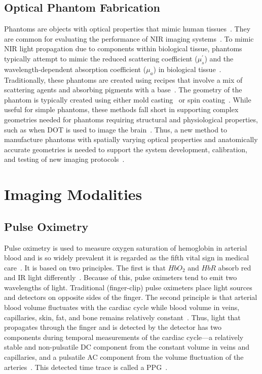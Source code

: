 \subsection{Optical Phantom Fabrication}
Phantoms are objects with optical properties that mimic human tissues~\cite{Pogue2006}. They are common for evaluating the performance of \ac{NIR} imaging systems~\cite{Pogue2006}. To mimic \ac{NIR} light propagation due to components within biological tissue, phantoms typically attempt to mimic the reduced scattering coefficient ($\mu_s^{'}$) and the wavelength-dependent absorption coefficient ($\mu_a$) in biological tissue~\cite{Dempsey2017}. Traditionally, these phantoms are created using recipes that involve a mix of scattering agents and absorbing pigments with a base~\cite{Hebden1995,Dong2015}. The geometry of the phantom is typically created using either mold casting~\cite{Hahn2012,Mobashsher2014} or spin coating~\cite{Park2013}. While useful for simple phantoms, these methods fall short in supporting complex geometries needed for phantoms requiring structural and physiological properties, such as when DOT is used to image the brain~\cite{Hebden2002,Villringer1997}. Thus, a new method to manufacture phantoms with spatially varying optical properties and anatomically accurate geometries is needed to support the system development, calibration, and testing of new imaging protocols~\cite{Cerussi2012,Diep2015}.  


\section{Imaging Modalities}
\label{chap:background:modalities}
\subsection{Pulse Oximetry}
Pulse oximetry is used to measure oxygen saturation of hemoglobin in arterial blood and is so widely prevalent it is regarded as the fifth vital sign in medical care~\cite{Neff1988}. It is based on two principles. The first is that $HbO_2$ and $HbR$ absorb red and \ac{IR} light differently~\cite{Bohn2015}. Because of this, pulse oximeters tend to emit two wavelengths of light. Traditional (finger-clip) pulse oximeters place light sources and detectors on opposite sides of the finger. The second principle is that arterial blood volume fluctuates with the cardiac cycle while blood volume in veins, capillaries, skin, fat, and bone remains relatively constant~\cite{Sinex1999}. Thus, light that propagates through the finger and is detected by the detector has two components during temporal measurements of the cardiac cycle---a relatively stable and non-pulsatile \ac{DC} component from the constant volume in veins and capillaries, and a pulsatile \ac{AC} component from the volume fluctuation of the arteries~\cite{Lopez2012}. This detected time trace is called a \ac{PPG}~\cite{Sinex1999}. 


